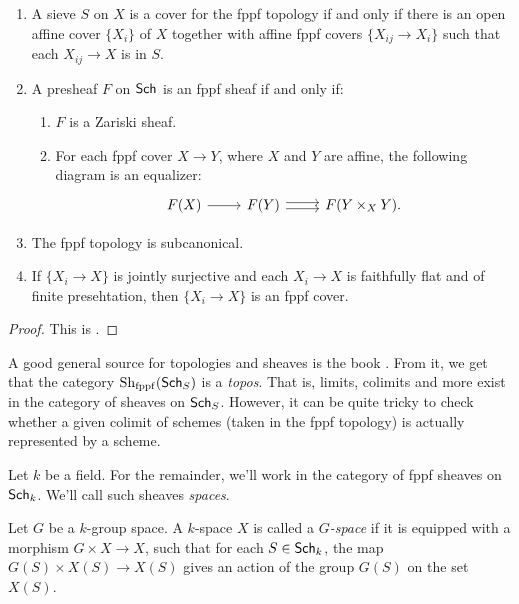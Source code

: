 \begin{theorem}
\leavevmode
\begin{enumerate}
\item
A sieve $S$ on $X$ is a cover for the fppf topology if and only if there is 
an open affine cover $\{X_i\}$ of $X$ together with affine fppf covers 
$\{X_{i j}\to X_i\}$ such that each $X_{i j}\to X$ is in $S$. 

\item A presheaf $F$ on $\mathsf{Sch}_{}$ is an fppf sheaf if and only if: 
  \begin{enumerate}
  \item $F$ is a Zariski sheaf.  
  \item For each fppf cover $X\to Y$, where $X$ and $Y$ are affine, the 
    following diagram is an equalizer: 
    \[\begin{tikzcd}
      F(X) \ar[r] 
        & F(Y) \ar[r, shift left=.5ex] \ar[r, shift right=.5ex]
        & F(Y\times_X Y) .
    \end{tikzcd}\]
  \end{enumerate}
  
\item The fppf topology is subcanonical. 

\item If $\{X_i\to X\}$ is jointly surjective and each $X_i\to X$ is 
faithfully flat and of finite presehtation, then $\{X_i\to X\}$ is an fppf 
cover. 
\end{enumerate}
\end{theorem}
\begin{proof}
This is \cite[IV 6.3.1]{sga3-i}. 
\end{proof}

A good general source for topologies and sheaves is the book 
\cite{maclane-moerdijk-1994}. From it, we get that the category 
$\operatorname{Sh}_{\mathrm{fppf}}(\mathsf{Sch}_{S})$ is a \emph{topos}. That is, limits, colimits 
and more exist in the category of sheaves on $\mathsf{Sch}_{S}$. However, it can 
be quite tricky to check whether a given colimit of schemes (taken in the 
fppf topology) is actually represented by a scheme. 

Let $k$ be a field. For the remainder, we'll work in the category of 
fppf sheaves on $\mathsf{Sch}_{k}$. We'll call such sheaves \emph{spaces}. 

\begin{definition}
Let $G$ be a $k$-group space. A $k$-space $X$ is called a \emph{$G$-space} if 
it is equipped with a morphism $G\times X\to X$, such that for each 
$S\in \mathsf{Sch}_{k}$, the map $G(S)\times X(S)\to X(S)$ gives an action of the 
group $G(S)$ on the set $X(S)$. 
\end{definition}

